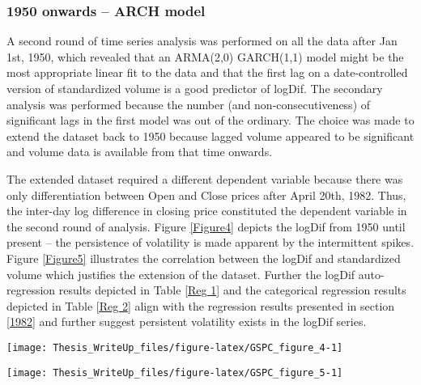 \documentclass[11pt,preprint, authoryear]{elsarticle}
\let\origfigure\figure
\let\endorigfigure\endfigure
\renewenvironment{figure}[1][2] {
    \expandafter\origfigure\expandafter[H]
} {
    \endorigfigure
}
\numberwithin{equation}{section}
\numberwithin{figure}{section}
\numberwithin{table}{section}
\begin{document}
\hypertarget{onwards-arch-model}{%
\subsubsection{1950 onwards -- ARCH model}\label{onwards-arch-model}}

A second round of time series analysis was performed on all the data
after Jan 1st, 1950, which revealed that an ARMA(2,0) GARCH(1,1) model
might be the most appropriate linear fit to the data and that the first
lag on a date-controlled version of standardized volume is a good
predictor of logDif. The secondary analysis was performed because the
number (and non-consecutiveness) of significant lags in the first model
was out of the ordinary. The choice was made to extend the dataset back
to 1950 because lagged volume appeared to be significant and volume data
is available from that time onwards.

The extended dataset required a different dependent variable because
there was only differentiation between Open and Close prices after April
20th, 1982. Thus, the inter-day log difference in closing price
constituted the dependent variable in the second round of analysis.
Figure \ref{Figure4} depicts the logDif from 1950 until present -- the
persistence of volatility is made apparent by the intermittent spikes.
Figure \ref{Figure5} illustrates the correlation between the logDif and
standardized volume which justifies the extension of the dataset.
Further the logDif auto-regression results depicted in Table \ref{Reg 1}
and the categorical regression results depicted in Table \ref{Reg 2}
align with the regression results presented in section \ref{1982} and
further suggest persistent volatility exists in the logDif series.

\begin{figure}[H]

{\centering \texttt{[image: Thesis\_WriteUp\_files/figure-latex/GSPC\_figure\_4-1]}

}

\caption{SandP 500 Closing Price Log Difference 1950 -- 2022 \label{Figure4}}\label{fig:GSPC_figure_4}
\end{figure}

\begin{figure}[H]

{\centering \texttt{[image: Thesis\_WriteUp\_files/figure-latex/GSPC\_figure\_5-1]}

}

\caption{Standardized volume (red) and absolute logDiff (green) \label{Figure5}}\label{fig:GSPC_figure_5}
\end{figure}
\end{document}

